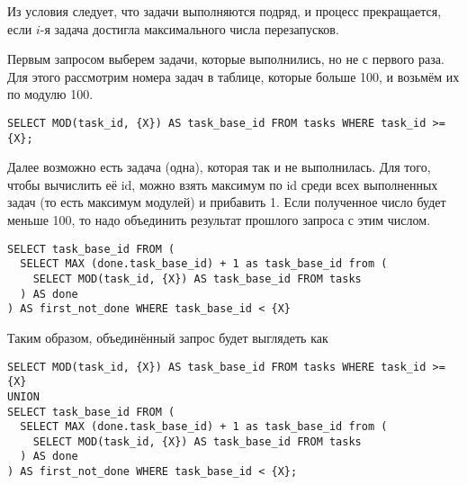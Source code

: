 \documentclass[a4paper, 12pt]{article}
\renewcommand{\le}{\leqslant}
\begin{document}
\begin{comment}
\begin{verbatim}
SELECT nums.num AS task_base_id FROM tasks RIGHT JOIN (
    SELECT decs_seq.decs * 10 + ones_seq.ones AS num FROM 
    (SELECT 0 AS decs 
    UNION ALL SELECT 1 UNION ALL SELECT 2 UNION ALL SELECT 3 
    UNION ALL SELECT 4 UNION ALL SELECT 5 UNION ALL SELECT 6 
    UNION ALL SELECT 7 UNION ALL SELECT 8 UNION ALL SELECT 9 
    ) AS decs_seq 
    CROSS JOIN
    (SELECT 0 AS ones 
    UNION ALL SELECT 1 UNION ALL SELECT 2 UNION ALL SELECT 3 
    UNION ALL SELECT 4 UNION ALL SELECT 5 UNION ALL SELECT 6 
    UNION ALL SELECT 7 UNION ALL SELECT 8 UNION ALL SELECT 9
    ) AS ones_seq
    WHERE decs * 10 + ones < {X}
) AS nums
ON MOD(tasks.task_id, {X}) = nums.num 
WHERE tasks.task_id IS NULL;
\end{verbatim}

Хочется отметить, что этот запрос можно использовать только для $X \le 100$, иначе нужно добавлять перебор сотен, тысяч и так далее (до $\log_{10}X$).

\end{comment}

Из условия следует, что задачи выполняются подряд, и процесс прекращается, если $i$-я задача достигла максимального числа перезапусков. 

Первым запросом выберем задачи, которые выполнились, но не с первого раза. Для этого рассмотрим номера задач в таблице, которые больше 100, и возьмём их по модулю 100. 

\begin{verbatim}
SELECT MOD(task_id, {X}) AS task_base_id FROM tasks WHERE task_id >= {X};
\end{verbatim}

Далее возможно есть задача (одна), которая так и не выполнилась. Для того, чтобы вычислить её id, можно взять максимум по id среди всех выполненных задач (то есть максимум модулей) и прибавить 1. Если полученное число будет меньше 100, то надо объединить результат прошлого запроса с этим числом.



\begin{verbatim}
SELECT task_base_id FROM (
  SELECT MAX (done.task_base_id) + 1 as task_base_id from (
    SELECT MOD(task_id, {X}) AS task_base_id FROM tasks
  ) AS done
) AS first_not_done WHERE task_base_id < {X}
\end{verbatim}

Таким образом, объединённый запрос будет выглядеть как 

\begin{verbatim}
SELECT MOD(task_id, {X}) AS task_base_id FROM tasks WHERE task_id >= {X}
UNION
SELECT task_base_id FROM (
  SELECT MAX (done.task_base_id) + 1 as task_base_id from (
    SELECT MOD(task_id, {X}) AS task_base_id FROM tasks
  ) AS done
) AS first_not_done WHERE task_base_id < {X};
\end{verbatim}
\end{document}
